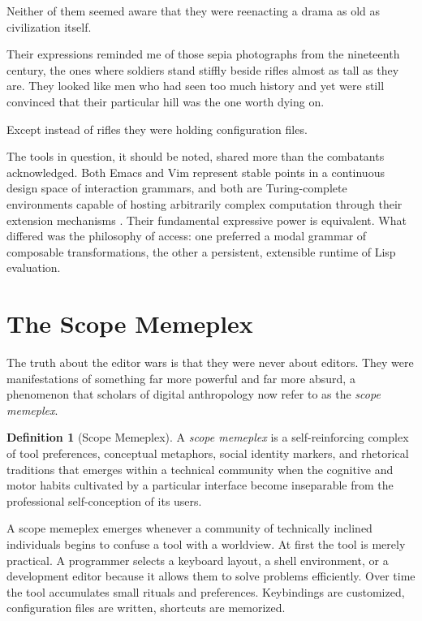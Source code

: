 \documentclass[11pt]{article}
\theoremstyle{definition}
\newtheorem{definition}{Definition}[section]
\begin{document}
Neither of them seemed aware that they were reenacting a drama as old as
civilization itself.

Their expressions reminded me of those sepia photographs from the
nineteenth century, the ones where soldiers stand stiffly beside rifles
almost as tall as they are. They looked like men who had seen too much
history and yet were still convinced that their particular hill was the
one worth dying on.

Except instead of rifles they were holding configuration files.

The tools in question, it should be noted, shared more than the combatants
acknowledged. Both Emacs and Vim represent stable points in a continuous
design space of interaction grammars, and both are Turing-complete
environments capable of hosting arbitrarily complex computation through
their extension mechanisms \cite{stallman2002,raymond2003}. Their
fundamental expressive power is equivalent. What differed was the
philosophy of access: one preferred a modal grammar of composable
transformations, the other a persistent, extensible runtime of Lisp
evaluation.

\section{The Scope Memeplex}

The truth about the editor wars is that they were never about editors.
They were manifestations of something far more powerful and far more
absurd, a phenomenon that scholars of digital anthropology now refer to
as the \emph{scope memeplex}.

\begin{definition}[Scope Memeplex]
A \emph{scope memeplex} is a self-reinforcing complex of tool preferences,
conceptual metaphors, social identity markers, and rhetorical traditions
that emerges within a technical community when the cognitive and motor
habits cultivated by a particular interface become inseparable from the
professional self-conception of its users.
\end{definition}

A scope memeplex emerges whenever a community of technically inclined
individuals begins to confuse a tool with a worldview. At first the tool
is merely practical. A programmer selects a keyboard layout, a shell
environment, or a development editor because it allows them to solve
problems efficiently. Over time the tool accumulates small rituals and
preferences. Keybindings are customized, configuration files are written,
shortcuts are memorized.
\end{document}
